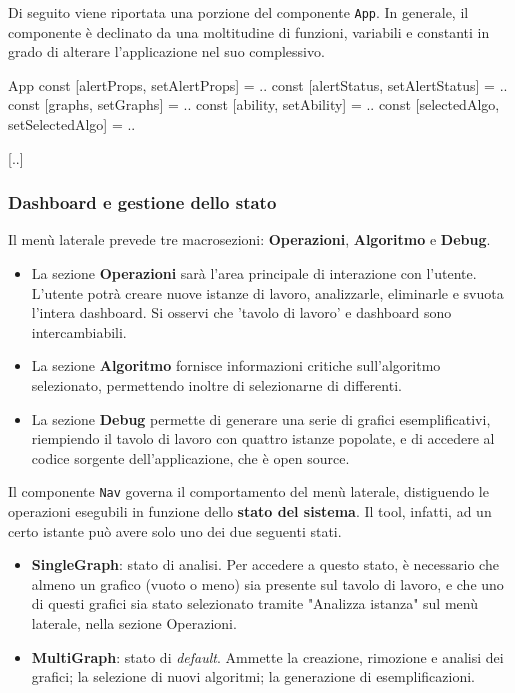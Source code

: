 Di seguito viene riportata una porzione del componente \verb|App|. In generale, il componente è declinato da una moltitudine di funzioni, variabili e constanti in grado di alterare l'applicazione nel suo complessivo.

\begin{sexylisting}{App}
const [alertProps, setAlertProps] = ..
const [alertStatus, setAlertStatus] = ..
const [graphs, setGraphs] = ..
const [ability, setAbility] = ..
const [selectedAlgo, setSelectedAlgo] = ..

[..]
\end{sexylisting}

\subsubsection{Dashboard e gestione dello stato}

Il menù laterale prevede tre macrosezioni: \textbf{Operazioni}, \textbf{Algoritmo} e \textbf{Debug}.

\vspace{3mm}

\begin{itemize}
    \item La sezione \textbf{Operazioni} sarà l'area principale di interazione con l'utente. L'utente potrà creare nuove istanze di lavoro, analizzarle, eliminarle e svuota l'intera dashboard. Si osservi che 'tavolo di lavoro' e dashboard sono intercambiabili.
    \item La sezione \textbf{Algoritmo} fornisce informazioni critiche sull'algoritmo selezionato, permettendo inoltre di selezionarne di differenti. 
    \item La sezione \textbf{Debug} permette di generare una serie di grafici esemplificativi, riempiendo il tavolo di lavoro con quattro istanze popolate, e di accedere al codice sorgente dell'applicazione, che è open source.
\end{itemize}

Il componente \verb|Nav| governa il comportamento del menù laterale, distiguendo le operazioni esegubili in funzione dello \textbf{stato del sistema}. Il tool, infatti, ad un certo istante può avere solo uno dei due seguenti stati.
\begin{itemize}
    \item \textbf{SingleGraph}: stato di analisi. Per accedere a questo stato, è necessario che almeno un grafico (vuoto o meno) sia presente sul tavolo di lavoro, e che uno di questi grafici sia stato selezionato tramite "Analizza istanza" sul menù laterale, nella sezione Operazioni.
    \item \textbf{MultiGraph}: stato di \textit{default}. Ammette la creazione, rimozione e analisi dei grafici; la selezione di nuovi algoritmi; la generazione di esemplificazioni.
\end{itemize}

